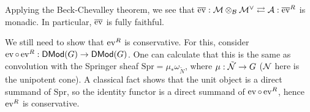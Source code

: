 \documentclass{article}
\begin{document}
Applying the Beck-Chevalley theorem, we see that $\overline{\operatorname{ev}}: \mathcal{M} \otimes_{\mathcal{B}} \mathcal{M}^\vee \rightleftarrows \mathcal{A} : \overline{\operatorname{ev}}^R$ is monadic.
In particular, $\overline{\operatorname{ev}}$ is fully faithful.

We still need to show that $\operatorname{ev}^R$ is conservative.
For this, consider $\operatorname{ev} \circ \operatorname{ev}^R: \mathsf{DMod}(G) \to \mathsf{DMod}(G)$.
One can calculate that this is the same as convolution with the Springer sheaf $\mathrm{Spr} = \mu_* \omega_{\tilde{N}}$, where $\mu: \tilde{\mathcal{N}} \to G$ ($\mathcal{N}$ here is the unipotent cone).
A classical fact shows that the unit object is a direct summand of $\mathrm{Spr}$, so the identity functor is a direct summand of $\operatorname{ev} \circ \operatorname{ev}^R$, hence $\operatorname{ev}^R$ is conservative.
\end{document}
